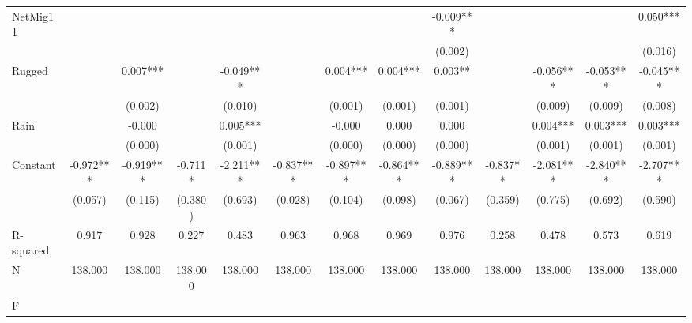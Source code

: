 {\begin{tabular}{l*{12}{c}}
NetMig11            &               &               &               &               &               &               &               &      -0.009***&               &               &               &       0.050***\\
                    &               &               &               &               &               &               &               &     (0.002)   &               &               &               &     (0.016)   \\
Rugged              &               &       0.007***&               &      -0.049***&               &       0.004***&       0.004***&       0.003** &               &      -0.056***&      -0.053***&      -0.045***\\
                    &               &     (0.002)   &               &     (0.010)   &               &     (0.001)   &     (0.001)   &     (0.001)   &               &     (0.009)   &     (0.009)   &     (0.008)   \\
Rain                &               &      -0.000   &               &       0.005***&               &      -0.000   &       0.000   &       0.000   &               &       0.004***&       0.003***&       0.003***\\
                    &               &     (0.000)   &               &     (0.001)   &               &     (0.000)   &     (0.000)   &     (0.000)   &               &     (0.001)   &     (0.001)   &     (0.001)   \\
Constant            &      -0.972***&      -0.919***&      -0.711*  &      -2.211***&      -0.837***&      -0.897***&      -0.864***&      -0.889***&      -0.837** &      -2.081***&      -2.840***&      -2.707***\\
                    &     (0.057)   &     (0.115)   &     (0.380)   &     (0.693)   &     (0.028)   &     (0.104)   &     (0.098)   &     (0.067)   &     (0.359)   &     (0.775)   &     (0.692)   &     (0.590)   \\
\hline
R-squared           &       0.917   &       0.928   &       0.227   &       0.483   &       0.963   &       0.968   &       0.969   &       0.976   &       0.258   &       0.478   &       0.573   &       0.619   \\
N                   &     138.000   &     138.000   &     138.000   &     138.000   &     138.000   &     138.000   &     138.000   &     138.000   &     138.000   &     138.000   &     138.000   &     138.000   \\
F                   &               &               &               &               &               &               &               &               &               &               &               &               \\
\hline\hline
\end{tabular}
}
